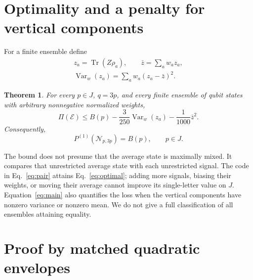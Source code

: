 \documentclass[aps,pra,reprint,amsmath,amssymb,longbibliography,nofootinbib]{revtex4-2}
\newtheorem{theorem}{Theorem}
\newcommand{\Tr}{\operatorname{Tr}}
\newcommand{\Var}{\operatorname{Var}}
\newcommand{\cN}{\mathcal N}
\newcommand{\cE}{\mathcal E}
\begin{document}
\section{Optimality and a penalty for vertical components}
For a finite ensemble define
\begin{equation}
 \begin{gathered}
 z_a=\Tr(Z\rho_a),\qquad \bar z=\sum_aw_az_a,\\
 \Var_w(z_a)=\sum_aw_a(z_a-\bar z)^2.
 \end{gathered}
 \label{eq:variance}
\end{equation}
\begin{theorem}\label{thm:main}
For every $p\in J$, $q=3p$, and every finite ensemble of qubit states with arbitrary nonnegative normalized weights,
\begin{equation}
 \Pi(\cE)\le B(p)-\frac3{250}\Var_w(z_a)
                         -\frac1{1000}\bar z^2.
 \label{eq:main}
\end{equation}
Consequently,
\begin{equation}
 P^{(1)}(\cN_{p,3p})=B(p),\qquad p\in J.
 \label{eq:optimal}
\end{equation}
\end{theorem}

The bound does not presume that the average state is maximally mixed. It compares that unrestricted average state with each unrestricted signal. The code in Eq.~\eqref{eq:pair} attains Eq.~\eqref{eq:optimal}; adding more signals, biasing their weights, or moving their average cannot improve its single-letter value on $J$. Equation~\eqref{eq:main} also quantifies the loss when the vertical components have nonzero variance or nonzero mean. We do not give a full classification of all ensembles attaining equality.

\section{Proof by matched quadratic envelopes}
\end{document}
